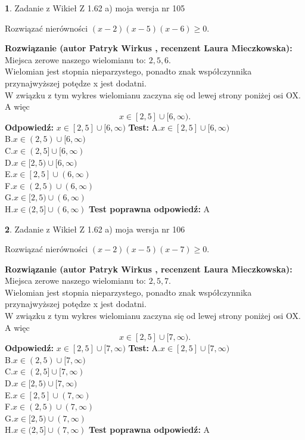 \documentclass[12pt, a4paper]{article}
\theoremstyle{definition} %
\newtheorem{zad}{}
\newcommand{\zadStart}[1]{\begin{zad}#1\newline}
\newcommand{\zadStop}{\end{zad}}
\newcommand{\rozwStart}[2]{\noindent \textbf{Rozwiązanie (autor #1 , recenzent #2): }\newline}
\newcommand{\rozwStop}{\newline}
\newcommand{\odpStart}{\noindent \textbf{Odpowiedź:}\newline}
\newcommand{\odpStop}{\newline}
\newcommand{\testStart}{\noindent \textbf{Test:}\newline}
\newcommand{\testStop}{\newline}
\newcommand{\kluczStart}{\noindent \textbf{Test poprawna odpowiedź:}\newline}
\newcommand{\kluczStop}{\newline}
\begin{document}
\zadStart{Zadanie z Wikieł Z 1.62 a) moja wersja nr 105}

Rozwiązać nierówności $(x-2)(x-5)(x-6)\ge0$.
\zadStop
\rozwStart{Patryk Wirkus}{Laura Mieczkowska}
Miejsca zerowe naszego wielomianu to: $2, 5, 6$.\\
Wielomian jest stopnia nieparzystego, ponadto znak współczynnika przy\linebreak najwyższej potędze x jest dodatni.\\ W związku z tym wykres wielomianu zaczyna się od lewej strony poniżej osi OX. A więc $$x \in [2,5] \cup [6,\infty).$$
\rozwStop
\odpStart
$x \in [2,5] \cup [6,\infty)$
\odpStop
\testStart
A.$x \in [2,5] \cup [6,\infty)$\\
B.$x \in (2,5) \cup [6,\infty)$\\
C.$x \in (2,5] \cup [6,\infty)$\\
D.$x \in [2,5) \cup [6,\infty)$\\
E.$x \in [2,5] \cup (6,\infty)$\\
F.$x \in (2,5) \cup (6,\infty)$\\
G.$x \in [2,5) \cup (6,\infty)$\\
H.$x \in (2,5] \cup (6,\infty)$
\testStop
\kluczStart
A
\kluczStop



\zadStart{Zadanie z Wikieł Z 1.62 a) moja wersja nr 106}

Rozwiązać nierówności $(x-2)(x-5)(x-7)\ge0$.
\zadStop
\rozwStart{Patryk Wirkus}{Laura Mieczkowska}
Miejsca zerowe naszego wielomianu to: $2, 5, 7$.\\
Wielomian jest stopnia nieparzystego, ponadto znak współczynnika przy\linebreak najwyższej potędze x jest dodatni.\\ W związku z tym wykres wielomianu zaczyna się od lewej strony poniżej osi OX. A więc $$x \in [2,5] \cup [7,\infty).$$
\rozwStop
\odpStart
$x \in [2,5] \cup [7,\infty)$
\odpStop
\testStart
A.$x \in [2,5] \cup [7,\infty)$\\
B.$x \in (2,5) \cup [7,\infty)$\\
C.$x \in (2,5] \cup [7,\infty)$\\
D.$x \in [2,5) \cup [7,\infty)$\\
E.$x \in [2,5] \cup (7,\infty)$\\
F.$x \in (2,5) \cup (7,\infty)$\\
G.$x \in [2,5) \cup (7,\infty)$\\
H.$x \in (2,5] \cup (7,\infty)$
\testStop
\kluczStart
A
\kluczStop
\end{document}
